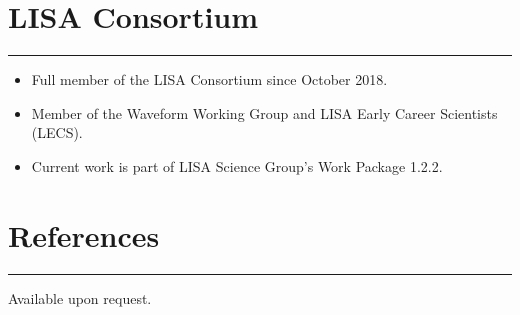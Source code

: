 \documentclass[10.5pt, oneside]{article}   	%
\begin{document}
{\color{Sectioncolour}
\section*{LISA Consortium}
\vspace{-3mm}
\noindent\rule{\linewidth}{0.6pt}}
\begin{itemize}
\item Full member of the LISA Consortium since October 2018.
\item Member of the Waveform Working Group and LISA Early Career Scientists (LECS).
\item Current work is part of LISA Science Group's Work Package 1.2.2.
\end{itemize} 

{\color{Sectioncolour}
\section*{References}
\vspace{-3mm}
\noindent\rule{\linewidth}{0.6pt}}
Available upon request.
\end{document}
